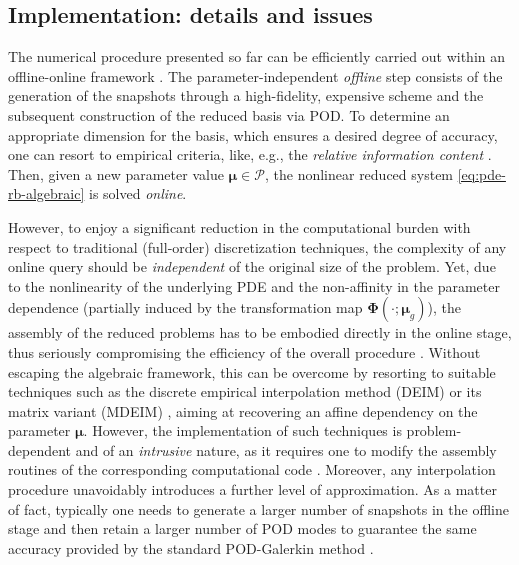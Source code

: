 \documentclass[longtitle]{elsarticle}
\numberwithin{equation}{section}
\theoremstyle{theorem}
\theoremstyle{definition}
\theoremstyle{remark}
\theoremstyle{proposition}
\numberwithin{figure}{section}
\newcommand{\bg}[1]{\boldsymbol{#1}}
\begin{document}
			
	
	\subsection{Implementation: details and issues}
	\label{section:Implementation: details and issues}
	
		The numerical procedure presented so far can be efficiently carried out within an offline-online framework \cite{Pru02}. The parameter-independent \emph{offline} step consists of the generation of the snapshots through a high-fidelity, expensive scheme and the subsequent construction of the reduced basis via POD. To determine an appropriate dimension for the basis, which ensures a desired degree of accuracy, one can resort to empirical criteria, like, e.g., the \emph{relative information content} \cite{QMN15}. Then, given a new parameter value $\bg{\mu} \in \mathcal{P}$, the nonlinear reduced system \eqref{eq:pde-rb-algebraic} is solved \emph{online}.				

		However, to enjoy a significant reduction in the computational burden with respect to traditional (full-order) discretization techniques, the complexity of any online query should be \emph{independent} of the original size of the problem. Yet, due to the nonlinearity of the underlying PDE and the non-affinity in the parameter dependence (partially induced by the transformation map $\bg{\Phi}(\cdot; \bg{\mu}_g)$), the assembly of the reduced problems has to be embodied directly in the online stage, thus seriously compromising the efficiency of the overall procedure \cite{Bar04}. Without escaping the algebraic framework, this can be overcome by resorting to suitable techniques such as the discrete empirical interpolation method (DEIM) \cite{Cha10} or its matrix variant (MDEIM) \cite{NMA15}, aiming at recovering an affine dependency on the parameter $\bg{\mu}$. However, the implementation of such techniques is problem-dependent and of an \emph{intrusive} nature, as it requires one to modify the assembly routines of the corresponding computational code \cite{Cas15}. Moreover, any interpolation procedure unavoidably introduces a further level of approximation. As a matter of fact, typically one needs to generate a larger number of snapshots in the offline stage and then retain a larger number of POD modes to guarantee the same accuracy provided by the standard POD-Galerkin method \cite{Bar04}.		
		
	
\end{document}
